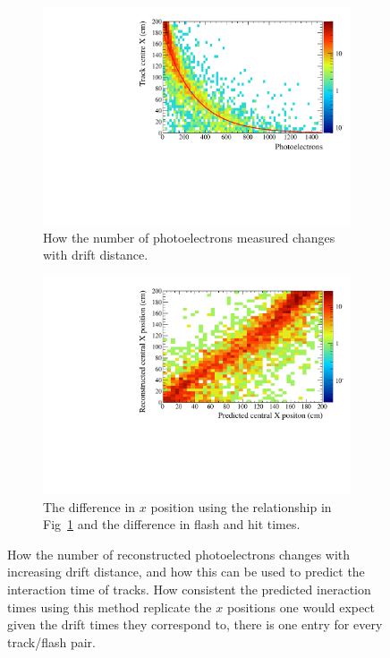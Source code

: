 \begin{figure}[h!]
  \centering
  \begin{subfigure}{0.45\textwidth}
    \centering
    \includegraphics[width=\textwidth]{NumPE_Distance}
    \caption{How the number of photoelectrons measured changes with drift distance.}
    \label{fig:PD_PExPlot}
  \end{subfigure}
  \hspace{0.08\textwidth}
  \begin{subfigure}{0.45\textwidth}
    \centering
    \includegraphics[width=\textwidth]{DiffFlashPredReco}
    \caption{The difference in $x$ position using the relationship in Fig~\ref{fig:PD_PExPlot} and the difference in flash and hit times.}
    \label{fig:PD_PEDiffX}
  \end{subfigure}
  \caption[Matching tracks and flashes in the 35 ton using photoelectron information]
          {How the number of reconstructed photoelectrons changes with increasing drift distance, and how this can be used to predict the interaction time of tracks. How consistent the predicted ineraction times using this method replicate the $x$ positions one would expect given the drift times they correspond to, there is one entry for every track/flash pair.}
\end{figure}

